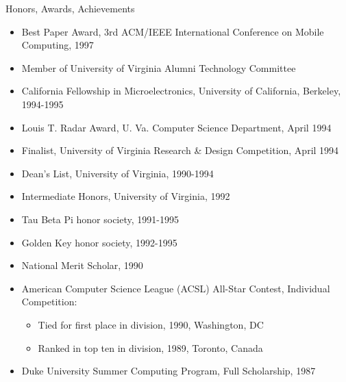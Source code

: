 \begin{bf} \large
Honors, Awards, Achievements  \\[-16pt]
\end{bf}

\begin{itemize}
\item  Best Paper Award, 3rd ACM/IEEE International Conference on Mobile Computing, 1997 \\[-18pt]
\item  Member of University of Virginia Alumni Technology Committee \\[-18pt]
\item  California Fellowship in Microelectronics,
        University of California, Berkeley, 1994-1995 \\[-18pt]
\item  Louis T. Radar Award, U. Va. Computer Science Department, April 1994 \\[-18pt]
\item  Finalist, University of Virginia Research \& Design Competition, 
        April 1994 \\[-18pt]
\item  Dean's List, University of Virginia, 1990-1994 \\[-18pt]
\item  Intermediate Honors, University of Virginia, 1992 \\[-18pt]
\item  Tau Beta Pi honor society, 1991-1995 \\[-18pt]
\item  Golden Key honor society, 1992-1995 \\[-18pt]
\item  National Merit Scholar, 1990 \\[-18pt]
\item  American Computer Science League (ACSL) All-Star Contest, 
         Individual Competition:  \\[-18pt]
    \begin{itemize}
    \item{Tied for first place in division, 1990, Washington, DC} \\[-14pt]
    \item{Ranked in top ten in division, 1989, Toronto, Canada} \\[-18pt]
    \end{itemize}
\item    Duke University Summer Computing Program, Full Scholarship, 1987 \\
\end{itemize}


